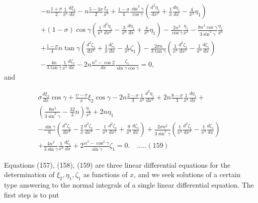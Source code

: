 \[\begin{aligned}
& -n \frac{1+\sigma}{2} \frac{1}{x^2} \frac{d \xi_2}{d x}-n \frac{5-3 \sigma}{2} \frac{\xi_2}{x^3}+\frac{1-\sigma}{4} \frac{\sin ^2 \gamma}{\cos \gamma}\left(\frac{d^2 \eta_1}{d x^2}+\frac{1}{x} \frac{d \eta_1}{d x}-\frac{4}{x^2} \eta_1\right) \\
& +(1-\sigma) \cos \gamma\left(\frac{1}{x^4} \frac{d^2 \eta_1}{d x^2}-\frac{3}{x^6} \frac{d \eta_1}{d x}+\frac{4}{x^6} \eta_1\right)-\frac{2 n^2}{\cos \gamma} \frac{\eta_1}{x^3}-\frac{8 n^3 \cos \gamma}{3 \sin ^2 \gamma} \frac{\eta_1}{x^6} \\
& +\frac{1-\sigma}{4} n \tan \gamma\left(\frac{d^2 \zeta_1}{d x^2}+\frac{1}{x} \frac{d \zeta_1}{d x}-\frac{4}{x^2} \zeta_1\right)-\frac{2 \sigma n}{3 \tan \gamma}\left(\frac{1}{x^4} \frac{d^2 \zeta_1}{d x^2}-\frac{1}{x^5} \frac{d \zeta_1}{d x}\right) \\
& -\frac{4 n}{3 \tan \gamma} \frac{1}{x^5} \frac{d \zeta_1}{d x}-2 n \frac{n^2-\cos 2}{d x} \frac{\zeta_1}{\sin \gamma \cos \gamma}=0,
\end{aligned}\]
and

\[\begin{array}{c}
\sigma \frac{d \xi_2}{d x} \cos \gamma+\frac{\psi-\sigma}{x} \xi_2 \cos \gamma-2 n \frac{2-\sigma}{3} \frac{1}{x^2} \frac{d^2 \eta_1}{d x^2}+2 n \frac{8-\sigma}{3} \frac{1}{x^3} \frac{d \eta_1}{d x}+\\
\left(\frac{8 n^3}{3 \sin ^2 \gamma}-\frac{32}{3} n\right) \frac{\eta_1}{x^4}+2 n \eta_1 \\
-\frac{\sin \gamma}{6}\left(\frac{d^4 \zeta_1}{d x^4}-\frac{2}{x} \frac{d^3 \zeta_1}{d x^3}-\frac{1}{x^2} \frac{d^2 \zeta_1}{d x^2}+\frac{9}{x^3} \frac{d \zeta_1}{d x}\right)+\frac{2 \sigma n^2}{3 \sin ^2 \gamma}\left(\frac{1}{x^2} \frac{d^2 \zeta_1}{d x^3}-\frac{1}{x^3} \frac{d \zeta_1}{d x}\right) \\
+\frac{4 n^2}{3 \sin \gamma} \frac{1}{x^3} \frac{d \zeta_1}{d x}+2 \frac{n^2-\cos ^2 \gamma}{\sin \gamma} \zeta_1=0 . \quad \ldots . .(159)
\end{array}\]


Equations (157), (158), (159) are three linear differential equations
for the determination of \(\xi_2, \eta_1, \zeta_1\) as functions of
\(x\), and we seek solutions of a certain type answering to the normal
integrals of a single linear differential equation. The first step is to
put

